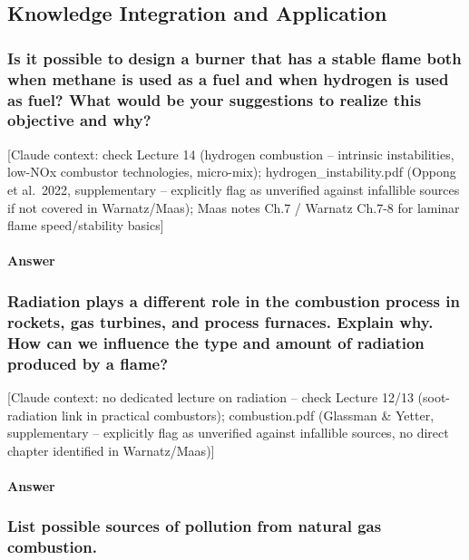 \subsection{Knowledge Integration and Application}

\subsubsection{Is it possible to design a burner that has a stable flame both when methane is used as a fuel and when hydrogen is used as fuel? What would be your suggestions to realize this objective and why?}

{\color{gray}\footnotesize [Claude context: check Lecture 14 (hydrogen combustion -- intrinsic instabilities, low-NOx combustor technologies, micro-mix); hydrogen\_instability.pdf (Oppong et al.\ 2022, supplementary -- explicitly flag as unverified against infallible sources if not covered in Warnatz/Maas); Maas notes Ch.7 / Warnatz Ch.7-8 for laminar flame speed/stability basics]}

\paragraph{Answer}




\subsubsection{Radiation plays a different role in the combustion process in rockets, gas turbines, and process furnaces. Explain why. How can we influence the type and amount of radiation produced by a flame?}

{\color{gray}\footnotesize [Claude context: no dedicated lecture on radiation -- check Lecture 12/13 (soot-radiation link in practical combustors); combustion.pdf (Glassman \& Yetter, supplementary -- explicitly flag as unverified against infallible sources, no direct chapter identified in Warnatz/Maas)]}

\paragraph{Answer}




\subsubsection{List possible sources of pollution from natural gas combustion.}

